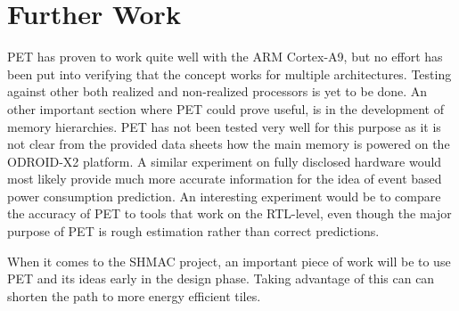 \section{Further Work}

PET has proven to work quite well with the ARM Cortex-A9, but no effort has been
put into verifying that the concept works for multiple architectures. Testing
against other both realized and non-realized processors is yet to be done. An
other important section where PET could prove useful, is in the development of
memory hierarchies. PET has not been tested very well for this purpose as it is
not clear from the provided data sheets how the main memory is powered on the
ODROID-X2 platform. A similar experiment on fully disclosed hardware would most
likely provide much more accurate information for the idea of event based power
consumption prediction. An interesting experiment would be to compare the
accuracy of PET to tools that work on the RTL-level, even though the major
purpose of PET is rough estimation rather than correct predictions.

When it comes to the SHMAC project, an important piece of work will be to use
PET and its ideas early in the design phase. Taking advantage of this can can
shorten the path to more energy efficient tiles.

